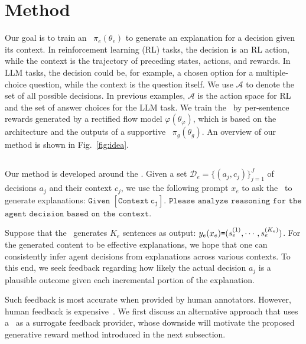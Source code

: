 \section{Method}

Our goal is to train an \elm~$\pi_e(\theta_e)$ 
to generate an explanation 
for a decision given its context. In reinforcement learning (RL) tasks, the decision is an RL action, while the context is the trajectory of preceding states, actions, and rewards. In LLM tasks, the decision could be, for example, a chosen option for a multiple-choice question, while the context is the question itself. We use $\mathcal{A}$ to denote the set of all possible decisions. In previous examples, $\mathcal{A}$ is the action space for RL and the set of answer choices for the LLM task. We train the \elm~by per-sentence rewards generated by a rectified flow model $\varphi(\theta_\varphi)$, which is based on the architecture and the outputs of a supportive \rlm~$\pi_g(\theta_g)$. An overview of our method is shown in Fig.~\ref{fig:idea}.

\subsection{\elm}

Our method is developed around the \elm. Given a set $\mathcal{D}_e=\{(a_j,c_j)\}_{j=1}^{J}$ of decisions $a_j$ and their context $c_j$, we use the following prompt $x_e$ to ask the \elm~to generate explanations: $\mathtt{Given}$ $\mathtt{\left[Context\ c_j\right].}$ $\mathtt{Please}$ $\mathtt{analyze}$ $\mathtt{reasoning}$ $\mathtt{for}$ $\mathtt{the}$ $\mathtt{agent}$ $\mathtt{decision}$ $\mathtt{based}$ $\mathtt{on}$ $\mathtt{the}$ $\mathtt{context}$. 

Suppose that the \elm~generates $K_e$ sentences as output: $y_e(x_e)\shorte (\idx[s][e][1], \cdots,\idx[s][e][K_e])$. For the generated content to be effective explanations, we hope that one can consistently infer agent decisions from explanations across various contexts. To this end, we seek feedback regarding how likely the actual decision $a_j$ is a plausible outcome given each incremental portion of the explanation. 

Such feedback is most accurate when provided by human annotators. However, human feedback is expensive~\cite{bai2022constitutional}. We first discuss an alternative approach that uses a \rlm~as a surrogate feedback provider, whose downside will motivate the proposed generative reward method introduced in the next subsection. 

